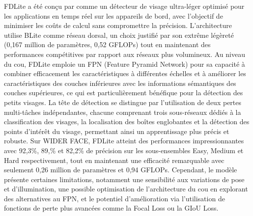 \begin{onehalfspace}
\hspace{0.65cm} FDLite a été conçu par \cite{Aggarwal2024FDLiteAS}  comme un détecteur de visage ultra-léger optimisé pour les applications en temps réel sur les appareils de bord, avec l'objectif de minimiser les coûts de calcul sans compromettre la précision. L'architecture utilise BLite comme réseau dorsal, un choix justifié par son extrême légèreté (0,167 million de paramètres, 0,52 GFLOPs) tout en maintenant des performances compétitives par rapport aux réseaux plus volumineux. Au niveau du cou, FDLite emploie un FPN (Feature Pyramid Network) pour sa capacité à combiner efficacement les caractéristiques à différentes échelles et à améliorer les caractéristiques des couches inférieures avec les informations sémantiques des couches supérieures, ce qui est particulièrement bénéfique pour la détection des petits visages. La tête de détection se distingue par l'utilisation de deux pertes multi-tâches indépendantes, chacune comprenant trois sous-réseaux dédiés à la classification des visages, la localisation des boîtes englobantes et la détection des points d'intérêt du visage, permettant ainsi un apprentissage plus précis et robuste. Sur WIDER FACE, FDLite atteint des performances impressionnantes avec 92,3\%, 89,\% et 82,2\% de précision sur les sous-ensembles Easy, Medium et Hard respectivement, tout en maintenant une efficacité remarquable avec seulement 0,26 million de paramètres et 0,94 GFLOPs. Cependant, le modèle présente certaines limitations, notamment une sensibilité aux variations de pose et d'illumination, une possible optimisation de l'architecture du cou en explorant des alternatives au FPN, et le potentiel d'amélioration via l'utilisation de fonctions de perte plus avancées comme la Focal Loss ou la GIoU Loss.


\end{onehalfspace}
